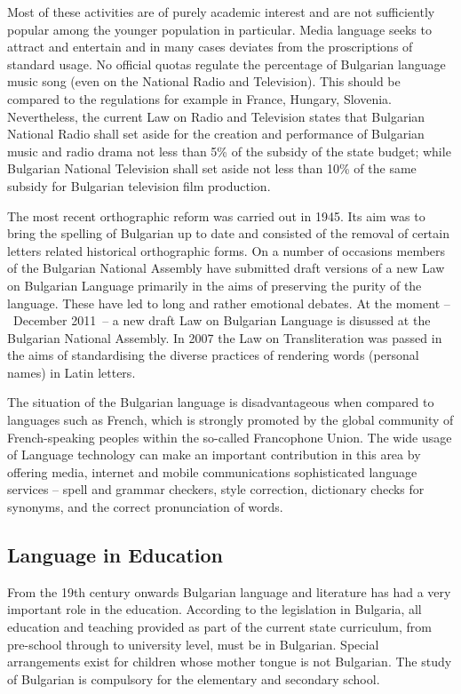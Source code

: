 \documentclass[]{../../metanetpaper}
\begin{document}
\begin{multicols}{2}
Most of these activities are of purely academic interest and are not sufficiently popular among the younger population in particular. Media language seeks to attract and entertain and in many cases deviates from the proscriptions of standard usage. No official quotas regulate the percentage of Bulgarian language music song (even on the National Radio and Television). This should be compared to the regulations for example in France, Hungary, Slovenia. Nevertheless, the current Law on Radio and Television states that Bulgarian National Radio shall set aside for the creation and performance of Bulgarian music and radio drama not less than 5\% of the subsidy of the state budget; while Bulgarian National Television shall set aside not less than 10\% of the same subsidy for Bulgarian television film production. 

The most recent orthographic reform was carried out in 1945. Its aim was to bring the spelling of Bulgarian up to date and consisted of the removal of certain letters related historical orthographic forms. On a number of occasions members of the Bulgarian National Assembly have submitted draft versions of a new Law on Bulgarian Language primarily in the aims of preserving the purity of the language. These have led to long and rather emotional debates. At the moment --~December 2011~-- a new draft Law on Bulgarian Language is disussed at the Bulgarian National Assembly.  In 2007 the Law on Transliteration was passed in the aims of standardising the diverse practices of rendering words (personal names) in Latin letters.

The situation of the Bulgarian language is disadvantageous when compared to languages such as French, which is strongly promoted by the global community of French-speaking peoples within the so-called Francophone Union. The wide usage of Language technology can make an important contribution in this area by offering media, internet and mobile communications sophisticated language services -- spell and grammar checkers, style correction, dictionary checks for synonyms, and the correct pronunciation of words.

\subsection{Language in Education}

From the 19th century onwards Bulgarian language and literature has had a very important role in the education. According to the legislation in Bulgaria, all education and teaching provided as part of the current state curriculum, from pre-school through to university level, must be in Bulgarian. Special arrangements exist for children whose mother tongue is not Bulgarian. The study of Bulgarian is compulsory for the elementary and secondary school.


\end{multicols}
\end{document}
